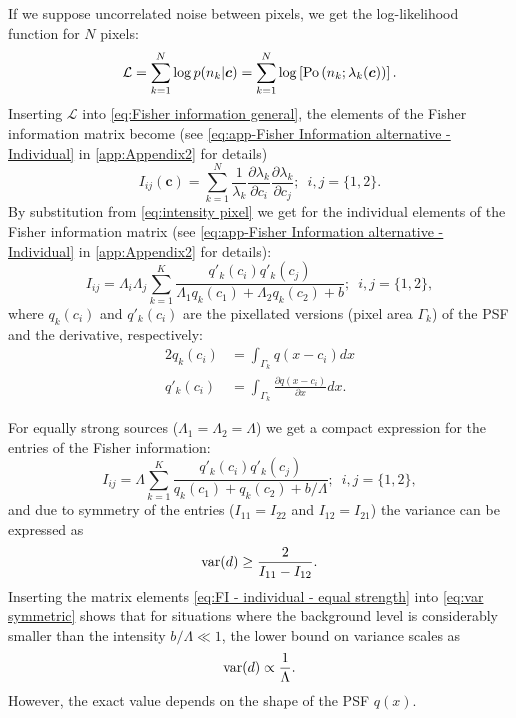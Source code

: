 If we suppose uncorrelated noise between pixels, we get the log-likelihood function for $N$ pixels: 
%
\begin{equation}
	\mathcal{L}=\sum_{k=1}^N\log p(n_k|\bm{c})=\sum_{k=1}^N\log\left[\mathrm{Po}\left(n_k;\lambda_k(\bm{c})\right)\right].
	\label{eq:FREM likelihood Poisson}
\end{equation}
%
Inserting $\mathcal{L}$ into \autoref{eq:Fisher information general}, the elements of the Fisher information matrix become (see \autoref{eq:app-Fisher Information alternative - Individual} in \autoref{app:Appendix2} for details)
%
\begin{equation}
	I_{ij}(\bm{c})=\sum_{k=1}^N\frac{1}{\lambda_k}\frac{\partial\lambda_k}{\partial c_i}\frac{\partial\lambda_k}{\partial c_j};\; \ i,j=\{1,2\}.
	\label{eq:FI - entries}
\end{equation}
%
By substitution from \autoref{eq:intensity pixel} we get for the individual elements of the Fisher information matrix (see \autoref{eq:app-Fisher Information alternative - Individual} in \autoref{app:Appendix2} for details): 
%
\begin{equation}
	I_{ij} =\Lambda_i\Lambda_j\sum_{k=1}^{K}\frac{q'_k(c_i)q'_k(c_j)}{\Lambda_1q_k(c_1)+\Lambda_2q_k(c_2)+b};\; \ i,j=\{1,2\},
	\label{eq:FI - individual}
\end{equation}
%
where $q_k(c_i)$ and $q'_k(c_i)$ are the pixellated versions (pixel area $\Gamma_k$) of the PSF and the derivative, respectively:
%
\begin{alignat*}{2}
	q_k(c_i) & =\int_{\Gamma_k}q(x-c_i)dx\\
	q'_k(c_i) & =\int_{\Gamma_k}\frac{\partial q(x-c_i)}{\partial x}dx.
\end{alignat*}

For equally strong sources ($\Lambda_1=\Lambda_2=\Lambda$) we get a compact expression for the entries of the Fisher information: 
%
\begin{equation}
	I_{ij} =\Lambda\sum_{k=1}^{K}\frac{q'_k(c_i)q'_k(c_j)}{q_k(c_1)+q_k(c_2)+b/\Lambda};\; \ i,j=\{1,2\},
	\label{eq:FI - individual - equal strength}
\end{equation}
%
and due to symmetry of the entries ($I_{11}=I_{22}$ and $I_{12}=I_{21}$) the variance can be expressed as
%
\begin{equation}
	\mathrm{var}(d)\geq\frac{2}{I_{11}-I_{12}}.
	\label{eq:var symmetric}
\end{equation}
%
Inserting the matrix elements \autoref{eq:FI - individual - equal strength} into \autoref{eq:var symmetric} shows that for situations where the background level is considerably smaller than the intensity $b/\Lambda\ll1$, the lower bound on variance scales as
%
\begin{equation}
	\mathrm{var}(d)\propto\frac{1}{\Lambda}. 
\end{equation}
%
However, the exact value depends on the shape of the PSF $q(x)$.

